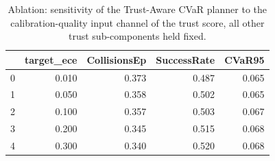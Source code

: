 \begin{table}
\caption{Ablation: sensitivity of the Trust-Aware CVaR planner to the calibration-quality input channel of the trust score, all other trust sub-components held fixed.}
\label{tab:ablation_calibration}
\begin{tabular}{lrrrr}
\toprule
 & target\_ece & CollisionsEp & SuccessRate & CVaR95 \\
\midrule
0 & 0.010 & 0.373 & 0.487 & 0.065 \\
1 & 0.050 & 0.358 & 0.502 & 0.065 \\
2 & 0.100 & 0.357 & 0.503 & 0.067 \\
3 & 0.200 & 0.345 & 0.515 & 0.068 \\
4 & 0.300 & 0.340 & 0.520 & 0.068 \\
\bottomrule
\end{tabular}
\end{table}
